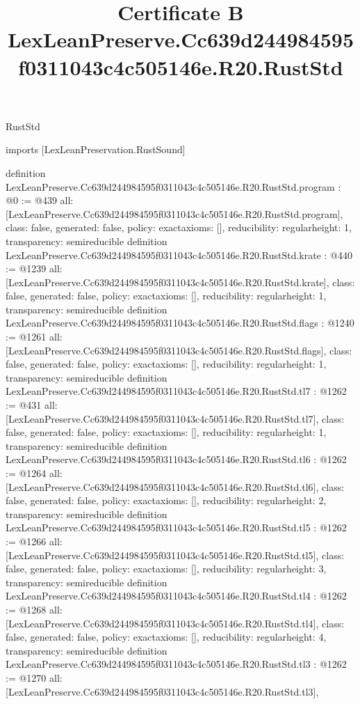 \begin{lexlean}{RustStd}
\title{Certificate B LexLeanPreserve.Cc639d244984595f0311043c4c505146e.R20.RustStd}
\begin{coremodule}
imports [LexLeanPreservation.RustSound]

definition LexLeanPreserve.Cc639d244984595f0311043c4c505146e.R20.RustStd.program : @0 := @439 {
  all: [LexLeanPreserve.Cc639d244984595f0311043c4c505146e.R20.RustStd.program],
  class: false,
  generated: false,
  policy: exact{axioms: []},
  reducibility: regular{height: 1},
  transparency: semireducible
}
definition LexLeanPreserve.Cc639d244984595f0311043c4c505146e.R20.RustStd.krate : @440 := @1239 {
  all: [LexLeanPreserve.Cc639d244984595f0311043c4c505146e.R20.RustStd.krate],
  class: false,
  generated: false,
  policy: exact{axioms: []},
  reducibility: regular{height: 1},
  transparency: semireducible
}
definition LexLeanPreserve.Cc639d244984595f0311043c4c505146e.R20.RustStd.flags : @1240 := @1261 {
  all: [LexLeanPreserve.Cc639d244984595f0311043c4c505146e.R20.RustStd.flags],
  class: false,
  generated: false,
  policy: exact{axioms: []},
  reducibility: regular{height: 1},
  transparency: semireducible
}
definition LexLeanPreserve.Cc639d244984595f0311043c4c505146e.R20.RustStd.tl7 : @1262 := @431 {
  all: [LexLeanPreserve.Cc639d244984595f0311043c4c505146e.R20.RustStd.tl7],
  class: false,
  generated: false,
  policy: exact{axioms: []},
  reducibility: regular{height: 1},
  transparency: semireducible
}
definition LexLeanPreserve.Cc639d244984595f0311043c4c505146e.R20.RustStd.tl6 : @1262 := @1264 {
  all: [LexLeanPreserve.Cc639d244984595f0311043c4c505146e.R20.RustStd.tl6],
  class: false,
  generated: false,
  policy: exact{axioms: []},
  reducibility: regular{height: 2},
  transparency: semireducible
}
definition LexLeanPreserve.Cc639d244984595f0311043c4c505146e.R20.RustStd.tl5 : @1262 := @1266 {
  all: [LexLeanPreserve.Cc639d244984595f0311043c4c505146e.R20.RustStd.tl5],
  class: false,
  generated: false,
  policy: exact{axioms: []},
  reducibility: regular{height: 3},
  transparency: semireducible
}
definition LexLeanPreserve.Cc639d244984595f0311043c4c505146e.R20.RustStd.tl4 : @1262 := @1268 {
  all: [LexLeanPreserve.Cc639d244984595f0311043c4c505146e.R20.RustStd.tl4],
  class: false,
  generated: false,
  policy: exact{axioms: []},
  reducibility: regular{height: 4},
  transparency: semireducible
}
definition LexLeanPreserve.Cc639d244984595f0311043c4c505146e.R20.RustStd.tl3 : @1262 := @1270 {
  all: [LexLeanPreserve.Cc639d244984595f0311043c4c505146e.R20.RustStd.tl3],
}
\end{coremodule}
\end{lexlean}

